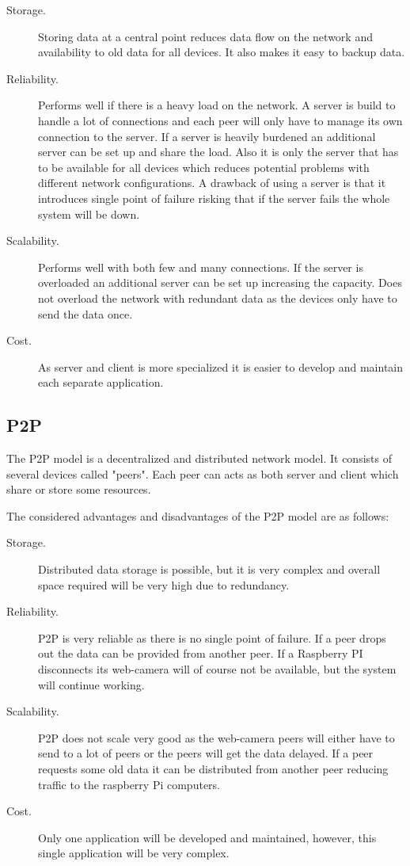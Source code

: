 \begin{description}
\item[Storage.] Storing data at a central point reduces data flow on the network and availability to old data for all devices. It also makes it easy to backup data.

\item[Reliability.] Performs well if there is a heavy load on the network. A server is build to handle a lot of connections and each peer will only have to manage its own connection to the server. If a server is heavily burdened an additional server can be set up and share the load. Also it is only the server that has to be available for all devices which reduces potential problems with different network configurations. A drawback of using a server is that it introduces single point of failure risking that if the server fails the whole system will be down.

\item[Scalability.] Performs well with both few and many connections. If the server is overloaded an additional server can be set up increasing the capacity. Does not overload the network with redundant data as the devices only have to send the data once.

\item[Cost.] As server and client is more specialized it is easier to develop and maintain each separate application. 
\end{description}

\subsection{P2P}
The P2P model is a decentralized and distributed network model. It consists of several devices called "peers". Each peer can acts as both server and client which share or store some resources.

The considered advantages and disadvantages of the P2P model are as follows:

\begin{description}
\item[Storage.] Distributed data storage is possible, but it is very complex and overall space required will be very high due to redundancy.

\item[Reliability.] P2P is very reliable as there is no single point of failure. If a peer drops out the data can be provided from another peer. If a Raspberry PI disconnects its web-camera will of course not be available, but the system will continue working.

\item[Scalability.] P2P does not scale very good as the web-camera peers will either have to send to a lot of peers or the peers will get the data delayed. If a peer requests some old data it can be distributed from another peer reducing traffic to the raspberry Pi computers.

\item[Cost.] Only one application will be developed and maintained, however, this single application will be very complex.
\end{description}

